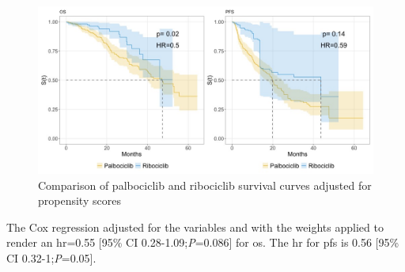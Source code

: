 \begin{figure}[ht]
  \centering

  \caption{Comparison of palbociclib and ribociclib survival curves adjusted for propensity scores}\label{fig:propensity} 
  \includegraphics[scale=0.42]{figures/propensity_score_both.jpeg}%

\end{figure}

The Cox regression adjusted for the variables and with the weights applied to render an \ac{hr}=0.55 [95\% CI 0.28-1.09;\textit{P}=0.086] for \ac{os}. The \ac{hr} for \ac{pfs} is 0.56 [95\% CI 0.32-1;\textit{P}=0.05].